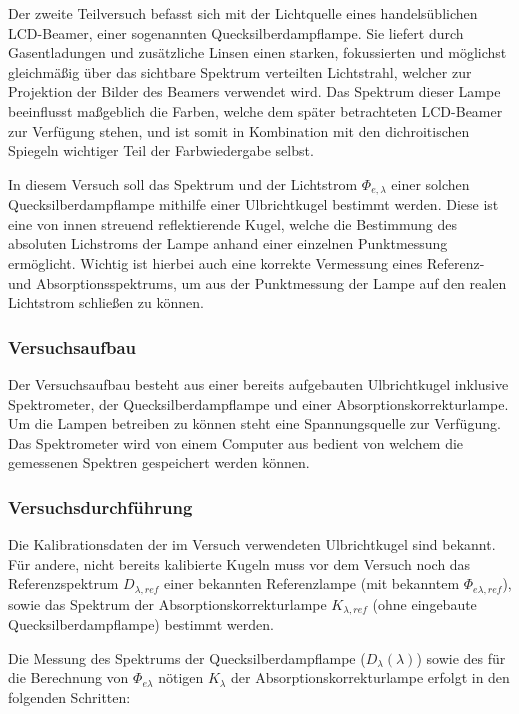 Der zweite Teilversuch befasst sich mit der Lichtquelle eines handelsüblichen LCD-Beamer, einer sogenannten Quecksilberdampflampe. Sie liefert durch Gasentladungen und zusätzliche Linsen einen starken, fokussierten und möglichst gleichmäßig über das sichtbare Spektrum verteilten Lichtstrahl, welcher zur Projektion der Bilder des Beamers verwendet wird. Das Spektrum dieser Lampe beeinflusst maßgeblich die Farben, welche dem später betrachteten LCD-Beamer zur Verfügung stehen, und ist somit in Kombination mit den dichroitischen Spiegeln wichtiger Teil der Farbwiedergabe selbst.

In diesem Versuch soll das Spektrum und der Lichtstrom $\Phi_{e,\lambda}$ einer solchen Quecksilberdampflampe mithilfe einer Ulbrichtkugel bestimmt werden. Diese ist eine von innen streuend reflektierende Kugel, welche die Bestimmung des absoluten Lichstroms der Lampe anhand einer einzelnen Punktmessung ermöglicht. Wichtig ist hierbei auch eine korrekte Vermessung eines Referenz- und Absorptionsspektrums, um aus der Punktmessung der Lampe auf den realen Lichtstrom schließen zu können.

\subsubsection{Versuchsaufbau}

Der Versuchsaufbau besteht aus einer bereits aufgebauten Ulbrichtkugel inklusive Spektrometer, der Quecksilberdampflampe und einer Absorptionskorrekturlampe. Um die Lampen betreiben zu können steht eine Spannungsquelle zur Verfügung. Das Spektrometer wird von einem Computer aus bedient von welchem die gemessenen Spektren gespeichert werden können.

\subsubsection{Versuchsdurchführung}

Die Kalibrationsdaten der im Versuch verwendeten Ulbrichtkugel sind bekannt. Für andere, nicht bereits kalibierte Kugeln muss vor dem Versuch noch das Referenzspektrum $D_{\lambda,ref}$ einer bekannten Referenzlampe (mit bekanntem $\Phi_{e\lambda,ref}$), sowie das Spektrum der Absorptionskorrekturlampe $K_{\lambda,ref}$ (ohne eingebaute Quecksilberdampflampe) bestimmt werden.

Die Messung des Spektrums der Quecksilberdampflampe ($D_\lambda(\lambda)$) sowie des für die Berechnung von $\Phi_{e\lambda}$ nötigen $K_\lambda$ der Absorptionskorrekturlampe erfolgt in den folgenden Schritten:

